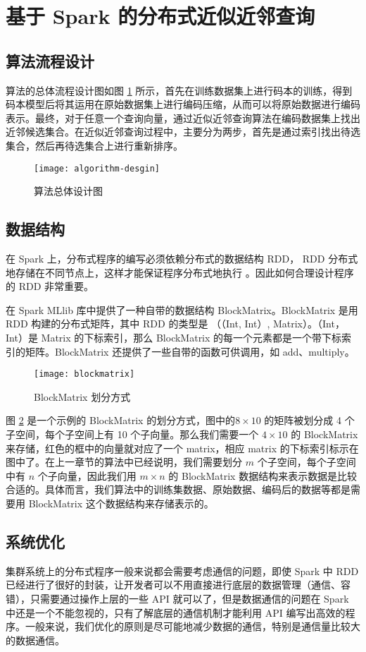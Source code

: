 \section{基于 Spark 的分布式近似近邻查询}
\subsection{算法流程设计}
算法的总体流程设计图如图 \ref{fig:algorithm-desgin} 所示，首先在训练数据集上进行码本的训练，得到码本模型后将其运用在原始数据集上进行编码压缩，从而可以将原始数据进行编码表示。最终，对于任意一个查询向量，通过近似近邻查询算法在编码数据集上找出近邻候选集合。在近似近邻查询过程中，主要分为两步，首先是通过索引找出待选集合，然后再待选集合上进行重新排序。
\begin{figure}[H]
  \centering
  \texttt{[image: algorithm-desgin]}
  \caption{算法总体设计图}
  \label{fig:algorithm-desgin}
\end{figure}
\subsection{数据结构}
在 Spark 上，分布式程序的编写必须依赖分布式的数据结构 RDD， RDD 分布式地存储在不同节点上，这样才能保证程序分布式地执行 。因此如何合理设计程序的 RDD 非常重要。

在 Spark MLlib 库中提供了一种自带的数据结构 BlockMatrix。BlockMatrix 是用 RDD 构建的分布式矩阵，其中 RDD 的类型是 （（Int, Int）, Matrix）。（Int，Int）是 Matrix 的下标索引，那么 BlockMatrix 的每一个元素都是一个带下标索引的矩阵。BlockMatrix 还提供了一些自带的函数可供调用，如 add、multiply。

\begin{figure}[H]
  \centering
  \texttt{[image: blockmatrix]}
  \caption{BlockMatrix 划分方式}
  \label{fig:blockmatrix}
\end{figure}

图 \ref{fig:blockmatrix} 是一个示例的 BlockMatrix 的划分方式，图中的$ 8\times 10$ 的矩阵被划分成 4 个子空间，每个子空间上有 10 个子向量。那么我们需要一个 $4\times 10$ 的 BlockMatrix 来存储，红色的框中的向量就对应了一个 matrix，相应 matrix 的下标索引标示在图中了。在上一章节的算法中已经说明，我们需要划分 $m$ 个子空间，每个子空间中有 $n$ 个子向量，因此我们用 $m\times n$ 的 BlockMatrix 数据结构来表示数据是比较合适的。具体而言，我们算法中的训练集数据、原始数据、编码后的数据等都是需要用 BlockMatrix 这个数据结构来存储表示的。
\subsection{系统优化}
集群系统上的分布式程序一般来说都会需要考虑通信的问题，即使 Spark 中 RDD 已经进行了很好的封装，让开发者可以不用直接进行底层的数据管理（通信、容错），只需要通过操作上层的一些 API 就可以了，但是数据通信的问题在 Spark 中还是一个不能忽视的，只有了解底层的通信机制才能利用 API 编写出高效的程序。一般来说，我们优化的原则是尽可能地减少数据的通信，特别是通信量比较大的数据通信。

